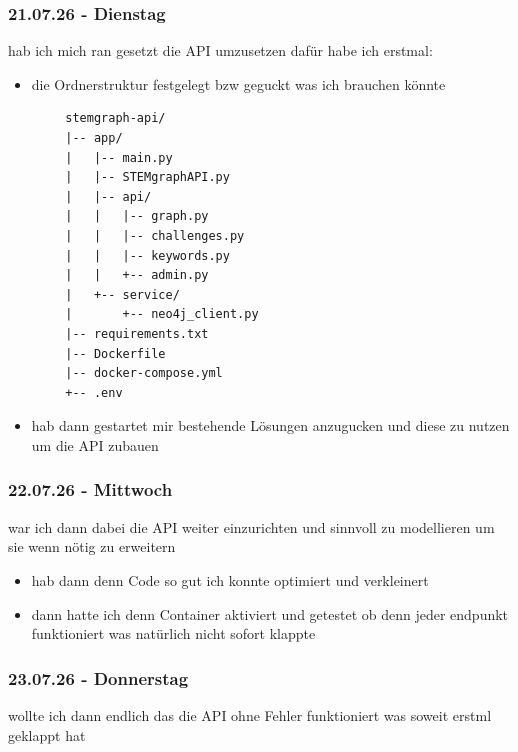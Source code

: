 \subsubsection{21.07.26 - Dienstag}

hab ich mich ran gesetzt die API umzusetzen dafür habe ich erstmal:

\begin{itemize}
\item die Ordnerstruktur festgelegt bzw geguckt was ich brauchen könnte
\end{itemize}

\begin{verbatim}
        stemgraph-api/
        |-- app/
        |   |-- main.py
        |   |-- STEMgraphAPI.py
        |   |-- api/
        |   |   |-- graph.py
        |   |   |-- challenges.py
        |   |   |-- keywords.py
        |   |   +-- admin.py
        |   +-- service/
        |       +-- neo4j_client.py
        |-- requirements.txt
        |-- Dockerfile
        |-- docker-compose.yml
        +-- .env
\end{verbatim}

\begin{itemize}
\item hab dann gestartet mir bestehende Lösungen anzugucken und diese zu nutzen um die API zubauen
\end{itemize}

\subsubsection{22.07.26 - Mittwoch}

war ich dann dabei die API weiter einzurichten und sinnvoll zu modellieren um sie wenn nötig zu erweitern

\begin{itemize}
\item hab dann denn Code so gut ich konnte optimiert und verkleinert
\item dann hatte ich denn Container aktiviert und getestet ob denn jeder endpunkt funktioniert was natürlich nicht sofort klappte
\end{itemize}

\subsubsection{23.07.26 - Donnerstag}

wollte ich dann endlich das die API ohne Fehler funktioniert was soweit erstml geklappt hat

